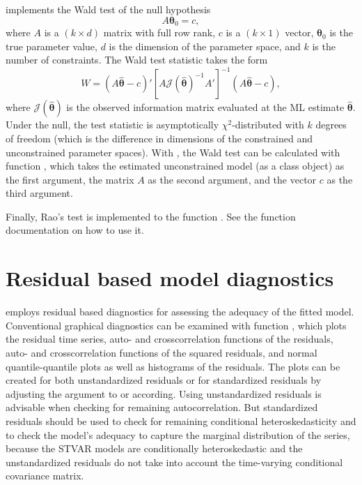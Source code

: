 \documentclass[nojss]{jss}
\begin{document}
 implements the Wald test of the null hypothesis
\begin{equation}
A\boldsymbol{\theta}_0 = c,
\end{equation}
where $A$ is a $(k \times d)$ matrix with full row rank, $c$ is a $(k \times 1)$ vector, $\boldsymbol{\theta}_0$ is the true parameter value, $d$ is the dimension of the parameter space, and $k$ is the number of constraints. The Wald test statistic takes the form
\begin{equation}
W = (A\hat{\boldsymbol{\theta}} - c)' [A\mathcal{J}(\hat{\boldsymbol{\theta}})^{-1}A']^{-1}(A\hat{\boldsymbol{\theta}} - c),
\end{equation}
where $\mathcal{J}(\hat{\boldsymbol{\theta}})$ is the observed information matrix evaluated at the ML estimate $\hat{\boldsymbol{\theta}}$. Under the null, the test statistic is asymptotically $\chi^2$-distributed with $k$ degrees of freedom (which is the difference in dimensions of the constrained and unconstrained parameter spaces). With , the Wald test can be calculated with function , which takes the estimated unconstrained model (as a class  object) as the first argument, the matrix $A$ as the second argument, and the vector $c$ as the third argument.

Finally, Rao's test is implemented to the function . See the function documentation on how to use it.


\section{Residual based model diagnostics}\label{sec:res}

 employs residual based diagnostics for assessing the adequacy of the fitted model. Conventional graphical diagnostics can be examined with function , which plots the residual time series, auto- and crosscorrelation functions of the residuals, auto- and crosscorrelation functions of the squared residuals, and normal quantile-quantile plots as well as histograms of the residuals. The plots can be created for both unstandardized residuals or for standardized residuals by adjusting the argument  to  or  according. Using unstandardized residuals is advisable when checking for remaining autocorrelation. But standardized residuals should be used to check for remaining conditional heteroskedasticity and to check the model's adequacy to capture the marginal distribution of the series, because the STVAR models are conditionally heteroskedastic and the unstandardized residuals do not take into account the time-varying conditional covariance matrix.
\end{document}
